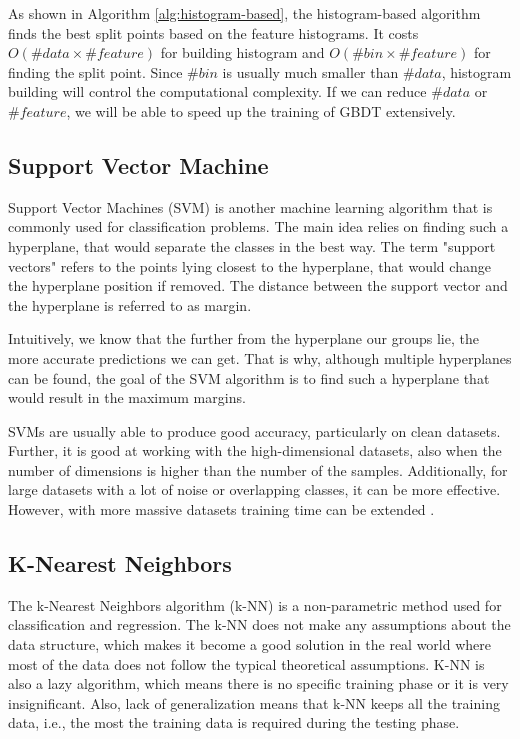 As shown in Algorithm \ref{alg:histogram-based}, the histogram-based algorithm finds the best split points based on the feature histograms. 
It costs $O(\#data \times \#feature)$ for building histogram and $O(\#bin \times \#feature)$ for finding the split point. Since $\#bin$ is usually much smaller than $\#data$, histogram building will control the computational complexity. If we can reduce $\#data$ or $\#feature$, we will be able to speed up the training of GBDT extensively.

\subsection{Support Vector Machine}

Support Vector Machines (SVM) is another machine learning algorithm that is commonly used for classification problems. The main idea relies on finding such a hyperplane, that would separate the classes in the best way. The term "support vectors" refers to the points lying closest to the hyperplane, that would change the hyperplane position if removed. The distance between the support vector and the hyperplane is referred to as margin.

Intuitively, we know that the further from the hyperplane our groups lie, the more accurate predictions we can get. That is why, although multiple hyperplanes can be found, the goal of the SVM algorithm is to find such a hyperplane that would result in the maximum margins.

SVMs are usually able to produce good accuracy, particularly on clean datasets. Further, it is good at working with the high-dimensional datasets, also when the number of dimensions is higher than the number of the samples. Additionally, for large datasets with a lot of noise or overlapping classes, it can be more effective. However, with more massive datasets training time can be extended \cite{jing2010view}.

\subsection{K-Nearest Neighbors}

The k-Nearest Neighbors algorithm (k-NN) is a non-parametric method used for classification and regression. The k-NN does not make any assumptions about the data structure, which makes it become a good solution in the real world where most of the data does not follow the typical theoretical assumptions. K-NN is also a lazy algorithm, which means there is no specific training phase or it is very insignificant.  Also, lack of generalization means that k-NN keeps all the training data, i.e., the most the training data is required during the testing phase.

